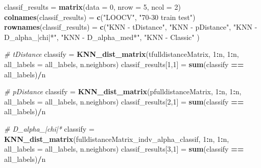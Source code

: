 \documentclass[
]{article}
\newenvironment{Shaded}{\begin{snugshade}}{\end{snugshade}}
\newcommand{\AttributeTok}[1]{\textcolor[rgb]{0.13,0.29,0.53}{#1}}
\newcommand{\CommentTok}[1]{\textcolor[rgb]{0.56,0.35,0.01}{\textit{#1}}}
\newcommand{\DecValTok}[1]{\textcolor[rgb]{0.00,0.00,0.81}{#1}}
\newcommand{\FunctionTok}[1]{\textcolor[rgb]{0.13,0.29,0.53}{\textbf{#1}}}
\newcommand{\NormalTok}[1]{#1}
\newcommand{\OtherTok}[1]{\textcolor[rgb]{0.56,0.35,0.01}{#1}}
\newcommand{\SpecialCharTok}[1]{\textcolor[rgb]{0.81,0.36,0.00}{\textbf{#1}}}
\newcommand{\StringTok}[1]{\textcolor[rgb]{0.31,0.60,0.02}{#1}}
\begin{document}
\begin{Shaded}
\begin{Highlighting}[]
\NormalTok{classif\_results }\OtherTok{=} \FunctionTok{matrix}\NormalTok{(}\AttributeTok{data =} \DecValTok{0}\NormalTok{, }\AttributeTok{nrow =} \DecValTok{5}\NormalTok{, }\AttributeTok{ncol =} \DecValTok{2}\NormalTok{)}
\FunctionTok{colnames}\NormalTok{(classif\_results) }\OtherTok{=} \FunctionTok{c}\NormalTok{(}\StringTok{"LOOCV"}\NormalTok{, }\StringTok{"70{-}30 train test"}\NormalTok{)}
\FunctionTok{rownames}\NormalTok{(classif\_results) }\OtherTok{=} \FunctionTok{c}\NormalTok{(}\StringTok{"KNN {-} tDistance"}\NormalTok{,}
                              \StringTok{"KNN {-} pDistance"}\NormalTok{,}
                              \StringTok{"KNN {-} D\_alpha\_|chi|*"}\NormalTok{,}
                              \StringTok{"KNN {-} D\_alpha\_med*"}\NormalTok{,}
                              \StringTok{"KNN {-} Classic"}
\NormalTok{)}

\CommentTok{\# tDistance }
\NormalTok{classify }\OtherTok{=} \FunctionTok{KNN\_dist\_matrix}\NormalTok{(tfulldistanceMatrix, }\DecValTok{1}\SpecialCharTok{:}\NormalTok{n, }\DecValTok{1}\SpecialCharTok{:}\NormalTok{n, }\AttributeTok{all\_labels =}\NormalTok{ all\_labels, n.neighbors)}
\NormalTok{classif\_results[}\DecValTok{1}\NormalTok{,}\DecValTok{1}\NormalTok{] }\OtherTok{=} \FunctionTok{sum}\NormalTok{(classify }\SpecialCharTok{==}\NormalTok{ all\_labels)}\SpecialCharTok{/}\NormalTok{n}

\CommentTok{\# pDistance}
\NormalTok{classify }\OtherTok{=} \FunctionTok{KNN\_dist\_matrix}\NormalTok{(pfulldistanceMatrix, }\DecValTok{1}\SpecialCharTok{:}\NormalTok{n, }\DecValTok{1}\SpecialCharTok{:}\NormalTok{n, }\AttributeTok{all\_labels =}\NormalTok{ all\_labels, n.neighbors)}
\NormalTok{classif\_results[}\DecValTok{2}\NormalTok{,}\DecValTok{1}\NormalTok{] }\OtherTok{=} \FunctionTok{sum}\NormalTok{(classify }\SpecialCharTok{==}\NormalTok{ all\_labels)}\SpecialCharTok{/}\NormalTok{n}

\CommentTok{\# D\_alpha\_|chi|*}
\NormalTok{classify }\OtherTok{=} \FunctionTok{KNN\_dist\_matrix}\NormalTok{(fulldistanceMatrix\_indv\_alpha\_classif, }\DecValTok{1}\SpecialCharTok{:}\NormalTok{n, }\DecValTok{1}\SpecialCharTok{:}\NormalTok{n, }\AttributeTok{all\_labels =}\NormalTok{ all\_labels, n.neighbors)}
\NormalTok{classif\_results[}\DecValTok{3}\NormalTok{,}\DecValTok{1}\NormalTok{] }\OtherTok{=} \FunctionTok{sum}\NormalTok{(classify }\SpecialCharTok{==}\NormalTok{ all\_labels)}\SpecialCharTok{/}\NormalTok{n}


\end{Highlighting}
\end{Shaded}
\end{document}

